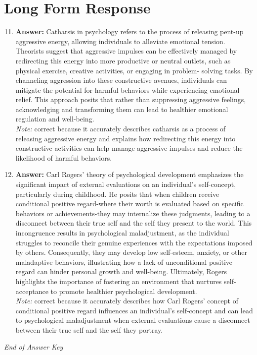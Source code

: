 \documentclass[12pt]{article}
\begin{document}
\section*{Long Form Response}
\begin{enumerate}[label=\arabic*.]
\setcounter{enumi}{10}
\item \textbf{Answer:} Catharsis in psychology refers to the process of releasing pent-up aggressive energy, allowing individuals to alleviate emotional tension. Theorists suggest that aggressive impulses can be effectively managed by redirecting this energy into more productive or neutral outlets, such as physical exercise, creative activities, or engaging in problem- solving tasks. By channeling aggression into these constructive avenues, individuals can mitigate the potential for harmful behaviors while experiencing emotional relief. This approach posits that rather than suppressing aggressive feelings, acknowledging and transforming them can lead to healthier emotional regulation and well-being.
\\ \textit{Note:} correct because it accurately describes catharsis as a process of releasing aggressive energy and explains how redirecting this energy into constructive activities can help manage aggressive impulses and reduce the likelihood of harmful behaviors.
\item \textbf{Answer:} Carl Rogers' theory of psychological development emphasizes the significant impact of external evaluations on an individual's self-concept, particularly during childhood. He posits that when children receive conditional positive regard-where their worth is evaluated based on specific behaviors or achievements-they may internalize these judgments, leading to a disconnect between their true self and the self they present to the world. This incongruence results in psychological maladjustment, as the individual struggles to reconcile their genuine experiences with the expectations imposed by others. Consequently, they may develop low self-esteem, anxiety, or other maladaptive behaviors, illustrating how a lack of unconditional positive regard can hinder personal growth and well-being. Ultimately, Rogers highlights the importance of fostering an environment that nurtures self-acceptance to promote healthier psychological development.
\\ \textit{Note:} correct because it accurately describes how Carl Rogers' concept of conditional positive regard influences an individual's self-concept and can lead to psychological maladjustment when external evaluations cause a disconnect between their true self and the self they portray.
\end{enumerate}

\vfill
\noindent\textit{End of Answer Key}
\end{document}
